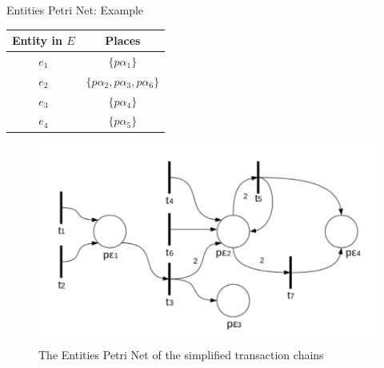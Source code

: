 \documentclass{beamer}
\begin{document}
\begin{frame}{Entities Petri Net: Example}
    \footnotesize
    \begin{center}
        \begin{tabular}{|c|c|}
            \hline
            Entity in $E$ & Places                                \\ \hline
            $e_1$         & $\{p\alpha_1\}$                       \\
            $e_2$         & $\{p\alpha_2, p\alpha_3, p\alpha_6\}$ \\
            $e_3$         & $\{p\alpha_4\}$                       \\
            $e_4$         & $\{p\alpha_5\}$                       \\
            \hline
        \end{tabular}
        \vspace{-0.2cm}
    \end{center}
    \begin{figure}
        \centering
        \includegraphics[width=0.7\linewidth]{reteEsemopio_EPT}
        \caption{The Entities Petri Net of the simplified transaction chains}
        \label{fig:reteesemopioept}
    \end{figure}
\end{frame}
\end{document}
